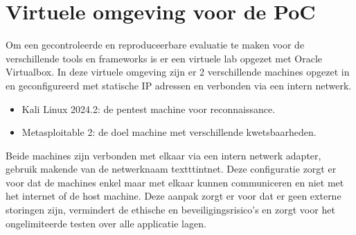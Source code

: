 \section{Virtuele omgeving voor de PoC}
Om een gecontroleerde en reproduceerbare evaluatie te maken voor de verschillende tools en frameworks is er een virtuele lab opgezet met Oracle Virtualbox.
In deze virtuele omgeving zijn er 2 verschillende machines opgezet in en geconfigureerd met statische IP adressen en verbonden via een intern netwerk.

\begin{itemize}
  \item Kali Linux 2024.2: de pentest machine voor reconnaissance. %
  \item Metasploitable 2: de doel machine met verschillende kwetsbaarheden. %
\end{itemize}

Beide machines zijn verbonden met elkaar via een intern netwerk adapter, gebruik makende van de netwerknaam texttt{intnet}.
Deze configuratie zorgt er voor dat de machines enkel maar met elkaar kunnen communiceren en niet met het internet of de host machine.
Deze aanpak zorgt er voor dat er geen externe storingen zijn, vermindert de ethische en beveiligingsrisico's en zorgt voor het ongelimiteerde testen over alle applicatie lagen.
